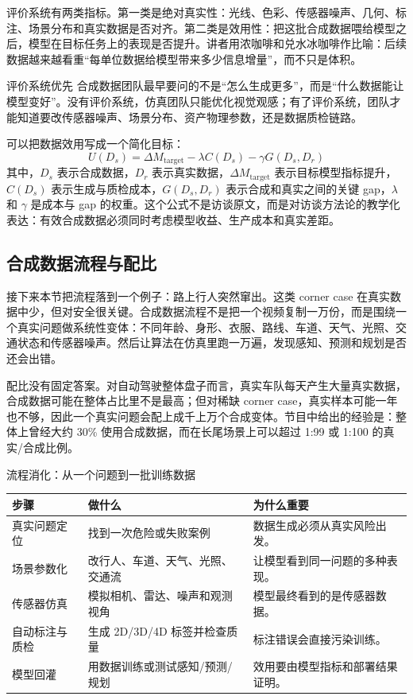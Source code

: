 \documentclass[a4paper]{article}
\begin{document}
评价系统有两类指标。第一类是绝对真实性：光线、色彩、传感器噪声、几何、标注、场景分布和真实数据是否对齐。第二类是效用性：把这批合成数据喂给模型之后，模型在目标任务上的表现是否提升。讲者用浓咖啡和兑水冰咖啡作比喻：后续数据越来越看重“每单位数据给模型带来多少信息增量”，而不只是体积。

\begin{importantbox}{评价系统优先}
合成数据团队最早要问的不是“怎么生成更多”，而是“什么数据能让模型变好”。没有评价系统，仿真团队只能优化视觉观感；有了评价系统，团队才能知道要改传感器噪声、场景分布、资产物理参数，还是数据质检链路。
\end{importantbox}

可以把数据效用写成一个简化目标：
\[
U(D_s)=\Delta M_{\mathrm{target}}-\lambda C(D_s)-\gamma G(D_s,D_r)
\]
其中，$D_s$ 表示合成数据，$D_r$ 表示真实数据，$\Delta M_{\mathrm{target}}$ 表示目标模型指标提升，$C(D_s)$ 表示生成与质检成本，$G(D_s,D_r)$ 表示合成和真实之间的关键 gap，$\lambda$ 和 $\gamma$ 是成本与 gap 的权重。这个公式不是访谈原文，而是对访谈方法论的教学化表达：有效合成数据必须同时考虑模型收益、生产成本和真实差距。

\subsection{合成数据流程与配比}

接下来本节把流程落到一个例子：路上行人突然窜出。这类 corner case 在真实数据中少，但对安全很关键。合成数据流程不是把一个视频复制一万份，而是围绕一个真实问题做系统性变体：不同年龄、身形、衣服、路线、车道、天气、光照、交通状态和传感器噪声。然后让算法在仿真里跑一万遍，发现感知、预测和规划是否还会出错。

配比没有固定答案。对自动驾驶整体盘子而言，真实车队每天产生大量真实数据，合成数据可能在整体占比里不是最高；但对稀缺 corner case，真实样本可能一年也不够，因此一个真实问题会配上成千上万个合成变体。节目中给出的经验是：整体上曾经大约 30\% 使用合成数据，而在长尾场景上可以超过 1:99 或 1:100 的真实/合成比例。

\begin{knowledgebox}{流程消化：从一个问题到一批训练数据}
\begin{tabularx}{\textwidth}{p{}p{}X}
\toprule
步骤 & 做什么 & 为什么重要 \\
\midrule
真实问题定位 & 找到一次危险或失败案例 & 数据生成必须从真实风险出发。 \\
场景参数化 & 改行人、车道、天气、光照、交通流 & 让模型看到同一问题的多种表现。 \\
传感器仿真 & 模拟相机、雷达、噪声和观测视角 & 模型最终看到的是传感器数据。 \\
自动标注与质检 & 生成 2D/3D/4D 标签并检查质量 & 标注错误会直接污染训练。 \\
模型回灌 & 用数据训练或测试感知/预测/规划 & 效用要由模型指标和部署结果证明。 \\
\bottomrule
\end{tabularx}
\end{knowledgebox}
\end{document}
